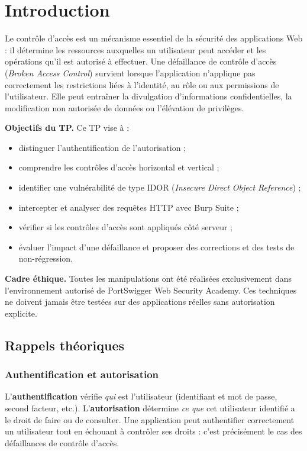\documentclass{rapportENSIAS}
\begin{document}
\fairemarges
\fairepagedegarde
\tabledematieres
\newpage

\section{Introduction}

Le contrôle d'accès est un mécanisme essentiel de la sécurité des applications Web : il détermine les ressources auxquelles un utilisateur peut accéder et les opérations qu'il est autorisé à effectuer. Une défaillance de contrôle d'accès (\textit{Broken Access Control}) survient lorsque l'application n'applique pas correctement les restrictions liées à l'identité, au rôle ou aux permissions de l'utilisateur. Elle peut entraîner la divulgation d'informations confidentielles, la modification non autorisée de données ou l'élévation de privilèges.

\textbf{Objectifs du TP.} Ce TP vise à :
\begin{itemize}
  \item distinguer l'authentification de l'autorisation ;
  \item comprendre les contrôles d'accès horizontal et vertical ;
  \item identifier une vulnérabilité de type IDOR (\textit{Insecure Direct Object Reference}) ;
  \item intercepter et analyser des requêtes HTTP avec Burp Suite ;
  \item vérifier si les contrôles d'accès sont appliqués côté serveur ;
  \item évaluer l'impact d'une défaillance et proposer des corrections et des tests de non-régression.
\end{itemize}

\textbf{Cadre éthique.} Toutes les manipulations ont été réalisées exclusivement dans l'environnement autorisé de PortSwigger Web Security Academy. Ces techniques ne doivent jamais être testées sur des applications réelles sans autorisation explicite.

\subsection{Rappels théoriques}

\subsubsection*{Authentification et autorisation}
L'\textbf{authentification} vérifie \textit{qui} est l'utilisateur (identifiant et mot de passe, second facteur, etc.). L'\textbf{autorisation} détermine \textit{ce que} cet utilisateur identifié a le droit de faire ou de consulter. Une application peut authentifier correctement un utilisateur tout en échouant à contrôler ses droits : c'est précisément le cas des défaillances de contrôle d'accès.
\end{document}

